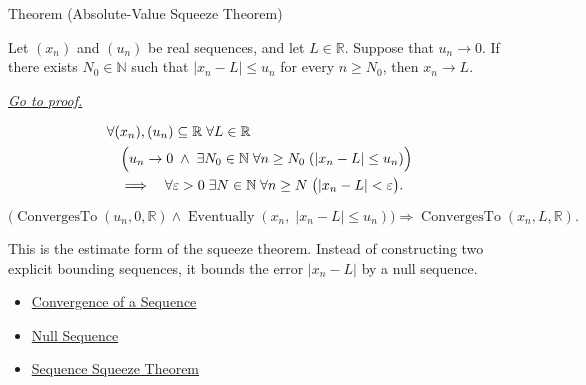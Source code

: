 \begin{theorembox}{Theorem (Absolute-Value Squeeze Theorem)}
\begin{theorem}
\label{thm:absolute-value-squeeze-theorem}

Let $(x_n)$ and $(u_n)$ be real sequences, and let $L\in\mathbb{R}$.
Suppose that $u_n\to 0$. If there exists $N_0\in\mathbb{N}$ such that
$|x_n-L|\le u_n$ for every $n\ge N_0$, then $x_n\to L$.

\smallskip
\noindent
\hyperref[prf:absolute-value-squeeze-theorem]{\textit{Go to proof.}}
\end{theorem}
\end{theorembox}

\begin{remark*}
\[
\begin{aligned}
&\forall (x_n),(u_n)\subseteq\mathbb{R}\;\forall L\in\mathbb{R}\\
&\quad\Bigl(
  u_n\to 0
  \;\land\;
  \exists N_0\in\mathbb{N}\;\forall n\ge N_0\;(|x_n-L|\le u_n)
\Bigr)\\
&\quad\Longrightarrow\quad
\forall \varepsilon>0\;\exists N\in\mathbb{N}\;\forall n\ge N\;
\bigl(|x_n-L|<\varepsilon\bigr).
\end{aligned}
\]
\end{remark*}

\begin{remark*}
\[
\bigl(
\operatorname{ConvergesTo}(u_n,0,\mathbb{R})
\land
\operatorname{Eventually}(x_n,\;|x_n-L|\le u_n)
\bigr)
\Longrightarrow
\operatorname{ConvergesTo}(x_n,L,\mathbb{R}).
\]
\end{remark*}

\begin{remark*}[Interpretation]
This is the estimate form of the squeeze theorem. Instead of constructing
two explicit bounding sequences, it bounds the error $|x_n-L|$ by a null
sequence.
\end{remark*}

\begin{dependencies}
\begin{itemize}
  \item \hyperref[def:convergent-sequence]{Convergence of a Sequence}
  \item \hyperref[def:null-sequence]{Null Sequence}
  \item \hyperref[thm:sequence-squeeze-theorem]{Sequence Squeeze Theorem}
\end{itemize}
\end{dependencies}

